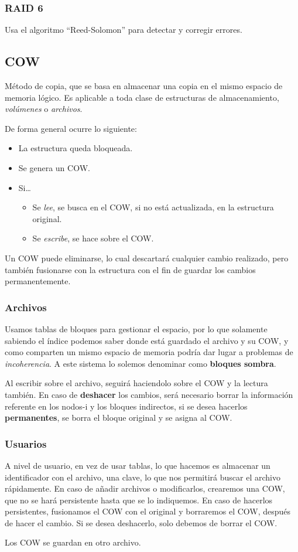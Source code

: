 \subsubsection{RAID 6}
Usa el algoritmo ``Reed-Solomon'' para detectar y corregir errores.
\subsection{COW}
Método de copia, que se basa en almacenar una copia en el mismo espacio de memoria lógico. Es aplicable a toda clase de estructuras de almacenamiento, \textit{volúmenes} o \textit{archivos}. %
\par  De forma general ocurre lo siguiente:
\begin{itemize}
        \item La estructura queda bloqueada.
        \item Se genera un COW.
        \item Si\dots
              \begin{itemize}
                      \item Se \textit{lee}, se busca en el COW, si no está actualizada, en la estructura original.
                      \item Se \textit{escribe}, se hace sobre el COW.
              \end{itemize}
\end{itemize}
Un COW puede eliminarse, lo cual descartará cualquier cambio realizado, pero también fusionarse con la estructura con el fin de guardar los cambios permanentemente.
\subsubsection{Archivos}
Usamos tablas de bloques para gestionar el espacio, por lo que solamente sabiendo el índice podemos saber donde está guardado el archivo y su COW, y como comparten un mismo espacio de memoria podría dar lugar a problemas de \textit{incoherencia}. A este sistema lo solemos denominar como \textbf{bloques sombra}.
\par  Al escribir sobre el archivo, seguirá haciendolo sobre el COW y la lectura también. En caso de \textbf{deshacer} los cambios, será necesario borrar la información referente en los nodos-i y los bloques indirectos, si se desea hacerlos \textbf{permanentes}, se borra el bloque original y se asigna al COW.
\subsubsection{Usuarios}
A nivel de usuario, en vez de usar tablas, lo que hacemos es almacenar un identificador con el archivo, una clave, lo que nos permitirá buscar el archivo rápidamente. En caso de añadir archivos o modificarlos, crearemos una COW, que no se hará persistente hasta que se lo indiquemos. En caso de hacerlos persistentes, fusionamos el COW con el original y borraremos el COW, después de hacer el cambio. Si se desea deshacerlo, solo debemos de borrar el COW.
\par  Los COW se guardan en otro archivo.
